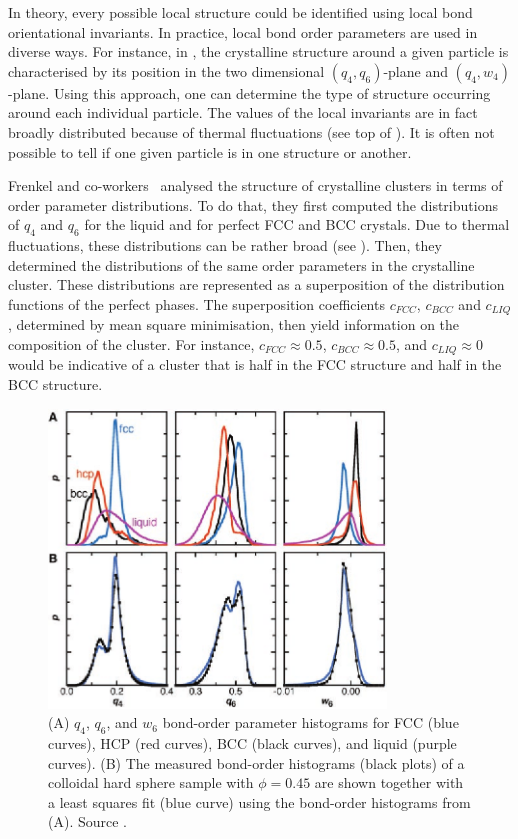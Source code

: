 In theory, every possible local structure could be identified using local bond orientational invariants. In practice, local bond order parameters are used in diverse ways. For instance, in , the crystalline structure around a given particle is characterised by its position in the two dimensional $(q_4, q_6)$-plane and $(q_4, w_4)$-plane. Using this approach, one can determine the type of structure occurring around each individual particle. The values of the local invariants are in fact broadly distributed because of thermal fluctuations (see top of ). It is often not possible to tell if one given particle is in one structure or another.

Frenkel and co-workers~\citep{Moroni2005, wolde:9932, wolde1999homogeneous, Volkov2002} analysed the structure of crystalline clusters in terms of order parameter distributions. To do that, they first computed the distributions of $q_4$ and $q_6$ for the liquid and for perfect \ac{FCC} and \ac{BCC} crystals. Due to thermal fluctuations, these distributions can be rather broad (see ). Then, they determined the distributions of the same order parameters in the crystalline cluster. These distributions are represented as a superposition of the distribution functions of the perfect phases. The superposition coefficients $c_{FCC}$, $c_{BCC}$ and $c_{LIQ}$, determined by mean square minimisation, then yield information on the composition of the cluster. For instance, $c_{FCC} \approx 0.5$, $c_{BCC} \approx 0.5$, and $c_{LIQ} \approx 0$ would be indicative of a cluster that is half in the \ac{FCC} structure and half in the \ac{BCC} structure.

\begin{figure}
	\centering
	\includegraphics[width=0.8\textwidth]{gasser_invariants}
	\caption{(A) $q_4$, $q_6$, and $w_6$ bond-order parameter histograms for \acs{FCC} (blue curves), \acs{HCP} (red curves), \acs{BCC} (black curves), and liquid (purple curves). (B) The measured bond-order histograms (black plots) of a colloidal hard sphere sample with $\phi=0.45$ are shown together with a least squares fit (blue curve) using the bond-order histograms from (A). Source .}
	\label{fig:invariantsFit}
\end{figure}


